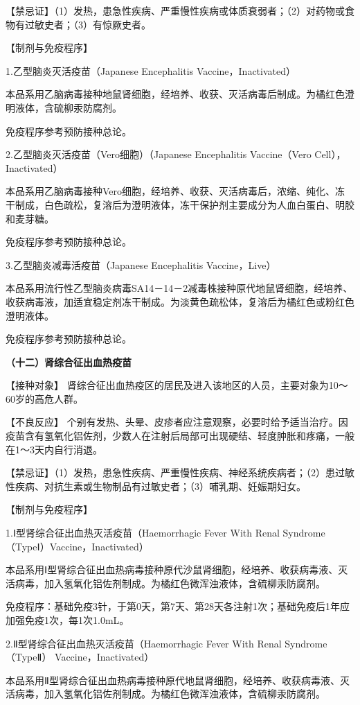【禁忌证】（1）发热，患急性疾病、严重慢性疾病或体质衰弱者；（2）对药物或食物有过敏史者；（3）有惊厥史者。

【制剂与免疫程序】

1.乙型脑炎灭活疫苗（Japanese Encephalitis Vaccine，Inactivated）

本品系用乙脑病毒接种地鼠肾细胞，经培养、收获、灭活病毒后制成。为橘红色澄明液体，含硫柳汞防腐剂。

免疫程序参考预防接种总论。

2.乙型脑炎灭活疫苗（Vero细胞）（Japanese Encephalitis Vaccine（Vero
Cell），Inactivated）

本品系用乙脑病毒接种Vero细胞，经培养、收获、灭活病毒后，浓缩、纯化、冻干制成，白色疏松，复溶后为澄明液体，冻干保护剂主要成分为人血白蛋白、明胶和麦芽糖。

免疫程序参考预防接种总论。

3.乙型脑炎减毒活疫苗（Japanese Encephalitis Vaccine，Live）

本品系用流行性乙型脑炎病毒SA14－14－2减毒株接种原代地鼠肾细胞，经培养、收获病毒液，加适宜稳定剂冻干制成。为淡黄色疏松体，复溶后为橘红色或粉红色澄明液体。

免疫程序参考预防接种总论。

\textbf{（十二）肾综合征出血热疫苗}

【接种对象】
肾综合征出血热疫区的居民及进入该地区的人员，主要对象为10～60岁的高危人群。

【不良反应】
个别有发热、头晕、皮疹者应注意观察，必要时给予适当治疗。因疫苗含有氢氧化铝佐剂，少数人在注射后局部可出现硬结、轻度肿胀和疼痛，一般在1～3天内自行消退。

【禁忌证】（1）发热，患急性疾病、严重慢性疾病、神经系统疾病者；（2）患过敏性疾病、对抗生素或生物制品有过敏史者；（3）哺乳期、妊娠期妇女。

【制剂与免疫程序】

1.Ⅰ型肾综合征出血热灭活疫苗（Haemorrhagic Fever With Renal
Syndrome（TypeⅠ）Vaccine，Inactivated）

本品系用Ⅰ型肾综合征出血热病毒接种原代沙鼠肾细胞，经培养、收获病毒液、灭活病毒，加入氢氧化铝佐剂制成。为橘红色微浑浊液体，含硫柳汞防腐剂。

免疫程序：基础免疫3针，于第0天，第7天、第28天各注射1次；基础免疫后1年应加强免疫1次，每1次1.0mL。

2.Ⅱ型肾综合征出血热灭活疫苗（Haemorrhagic Fever With Renal
Syndrome（TypeⅡ） Vaccine，Inactivated）

本品系用Ⅱ型肾综合征出血热病毒接种原代地鼠肾细胞，经培养、收获病毒液、灭活病毒，加入氢氧化铝佐剂制成。为橘红色微浑浊液体，含硫柳汞防腐剂。

